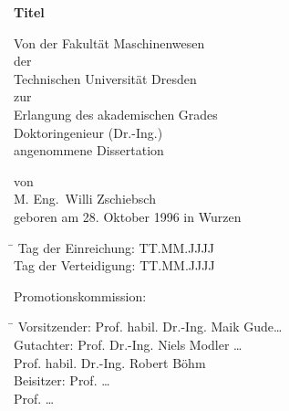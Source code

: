 \begin{titlepage}

\centering
\vspace*{-2.0cm}

{\renewcommand{\baselinestretch}{1.4}\LARGE
{\textbf{Titel}}\par
}

\vspace{1cm}

Von der Fakultät Maschinenwesen \\[+0.5\baselineskip]
der\\[+0.5\baselineskip]
Technischen Universität Dresden \\[+0.5\baselineskip]
zur\\[+0.5\baselineskip]
Erlangung des akademischen Grades \\[+0.5\baselineskip]
Doktoringenieur (Dr.-Ing.) \\[+0.5\baselineskip]
angenommene Dissertation

\vspace{1cm}

von \\[+0.5\baselineskip]
{\large M. Eng.\ Willi Zschiebsch} \\[+0.5\baselineskip]
geboren am 28. Oktober 1996 in Wurzen \\

\vspace{1cm}

\begin{tabbing}
\hspace*{4.3cm}\= \kill
Tag der Einreichung: \> TT.MM.JJJJ \\
Tag der Verteidigung: \> TT.MM.JJJJ 
\end{tabbing}

\vspace{1cm}

\raggedright
Promotionskommission:
\begin{tabbing}
\hspace*{2.8cm}\= \kill
Vorsitzender: 	\> Prof. habil. Dr.-Ing. Maik Gude\dots \\[+0.5\baselineskip]
Gutachter:    	\> Prof. Dr.-Ing. Niels Modler \dots \\
				\> Prof. habil. Dr.-Ing. Robert Böhm \\[+0.5\baselineskip]
Beisitzer: 		\> Prof. \dots \\
							\> Prof. \dots \\
\end{tabbing}
\end{titlepage}

